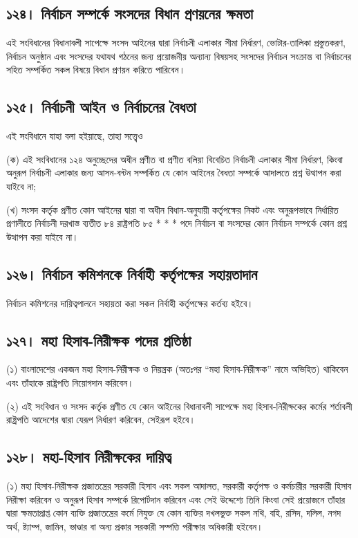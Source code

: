 \documentclass[11pt]{article}
\begin{document}
\subsection{১২৪। নির্বাচন সম্পর্কে সংসদের বিধান প্রণয়নের ক্ষমতা}
\label{sec:org4cad168}
এই সংবিধানের বিধানাবলী সাপেক্ষে সংসদ আইনের দ্বারা নির্বাচনী এলাকার সীমা
নির্ধারণ, ভোটার-তালিকা প্রস্তুতকরণ, নির্বাচন অনুষ্ঠান এবং সংসদের যথাযথ গঠনের
জন্য প্রয়োজনীয় অন্যান্য বিষয়সহ সংসদের নির্বাচন সংক্রান্ত বা নির্বাচনের সহিত
সম্পর্কিত সকল বিষয়ে বিধান প্রণয়ন করিতে পারিবেন।

\subsection{১২৫। নির্বাচনী আইন ও নির্বাচনের বৈধতা}
\label{sec:org732c313}
এই সংবিধানে যাহা বলা হইয়াছে, তাহা সত্ত্বেও

(ক) এই সংবিধানের ১২৪ অনুচ্ছেদের অধীন প্রণীত বা প্রণীত বলিয়া বিবেচিত
    নির্বাচনী এলাকার সীমা নির্ধারণ, কিংবা অনুরূপ নির্বাচনী এলাকার জন্য আসন-বন্টন
    সম্পর্কিত যে কোন আইনের বৈধতা সম্পর্কে আদালতে প্রশ্ন উত্থাপন করা যাইবে না;

(খ) সংসদ কর্তৃক প্রণীত কোন আইনের দ্বারা বা অধীন বিধান-অনুযায়ী কর্তৃপক্ষের নিকট
    এবং অনুরূপভাবে নির্ধারিত প্রণালীতে নির্বাচনী দরখাস্ত ব্যতীত ৮৪ রাষ্ট্রপতি
    ৮৫ * * * পদে নির্বাচন বা সংসদের কোন নির্বাচন সম্পর্কে কোন প্রশ্ন উত্থাপন করা
    যাইবে না।

\subsection{১২৬। নির্বাচন কমিশনকে নির্বাহী কর্তৃপক্ষের সহায়তাদান}
\label{sec:org8309c91}
নির্বাচন কমিশনের দায়িত্বপালনে সহায়তা করা সকল নির্বাহী কর্তৃপক্ষের কর্তব্য
হইবে।

\subsection{১২৭। মহা হিসাব-নিরীক্ষক পদের প্রতিষ্ঠা}
\label{sec:org615fed7}
(১) বাংলাদেশের একজন মহা হিসাব-নিরীক্ষক ও নিয়ন্ত্রক (অতঃপর “মহা
    হিসাব-নিরীক্ষক” নামে অভিহিত) থাকিবেন এবং তাঁহাকে রাষ্ট্রপতি নিয়োগদান
    করিবেন।

(২) এই সংবিধান ও সংসদ কর্তৃক প্রণীত যে কোন আইনের বিধানাবলী সাপেক্ষে মহা
    হিসাব-নিরীক্ষকের কর্মের শর্তাবলী রাষ্ট্রপতি আদেশের দ্বারা যেরূপ নির্ধারণ
    করিবেন, সেইরূপ হইবে।

\subsection{১২৮। মহা-হিসাব নিরীক্ষকের দায়িত্ব}
\label{sec:orgd097fe5}
(১) মহা হিসাব-নিরীক্ষক প্রজাতন্ত্রের সরকারী হিসাব এবং সকল আদালত, সরকারী
    কর্তৃপক্ষ ও কর্মচারীর সরকারী হিসাব নিরীক্ষা করিবেন ও অনুরূপ হিসাব সম্পর্কে
    রিপোর্টদান করিবেন এবং সেই উদ্দেশ্যে তিনি কিংবা সেই প্রয়োজনে তাঁহার দ্বারা
    ক্ষমতাপ্রাপ্ত কোন ব্যক্তি প্রজাতন্ত্রের কর্মে নিযুক্ত যে কোন ব্যক্তির দখলভুক্ত সকল
    নথি, বহি, রসিদ, দলিল, নগদ অর্থ, ষ্ট্যাম্প, জামিন, ভাণ্ডার বা অন্য প্রকার
    সরকারী সম্পত্তি পরীক্ষার অধিকারী হইবেন।
\end{document}
